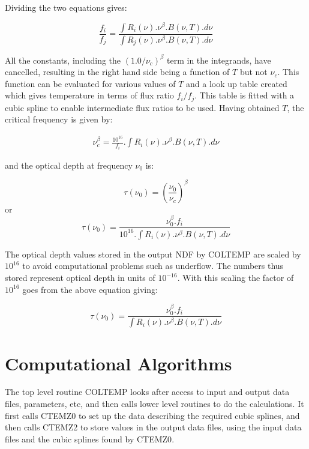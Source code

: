 Dividing the two equations gives:

\begin{equation}
\label{EQ:RAT}
\frac{f_{i}}{f_{j}} = \frac{ \int R_{i}(\nu).\nu^{\beta}.B( \nu, T ).d\nu}
{ \int R_{j}(\nu).\nu^{\beta}.B( \nu, T ).d\nu}
\end{equation}

All the constants, including the $(1.0/\nu_{c})^{\beta}$ term in the integrands,
have cancelled, resulting in the right hand side being a function of $T$ but not
$\nu_{c}$. This function can be evaluated for various values of $T$ and a look
up table created which gives temperature in terms of flux ratio $f_{i}/f_{j}$.
This table is fitted with a cubic spline to enable intermediate flux ratios to
be used. Having obtained $T$, the critical frequency is given by:

\begin{eqnarray*}
\nu_c^{\beta} = \frac{10^{16}}{f_{i}}.\int R_{i}(\nu).\nu^{\beta}.B( \nu, T ).d\nu
\end{eqnarray*}

and the optical depth at frequency $\nu_{0}$ is:

\begin{equation}
\label{EQ:TAUN}
\tau(\nu_{0}) = \left(\frac{\nu_{0}}{\nu_{c} }\right)^{\beta}
\end{equation}
or
\begin{equation}
\tau(\nu_{0}) = \frac{\nu_{0}^{\beta}.f_{i}}{10^{16}.\int R_{i}(\nu).\nu^{\beta}.B( \nu, T ).d\nu}
\end{equation}

The optical depth values stored in the output {\small NDF} by {\small COLTEMP}
are scaled by $10^{16}$ to avoid computational problems such as underflow. The
numbers thus stored represent optical depth in units of $10^{-16}$. With this
scaling the factor of $10^{16}$ goes from the above equation giving:

\begin{equation}
\label {EQ:TAU}
\tau(\nu_{0}) = \frac{\nu_{0}^{\beta}.f_{i}}{\int R_{i}(\nu).\nu^{\beta}.B( \nu, T ).d\nu}
\end{equation}

\section{Computational Algorithms}
The top level routine {\small COLTEMP} looks after access to input and output
data files, parameters, etc, and then calls lower level routines to do the
calculations. It first calls {\small CTEMZ0} to set up the data describing the
required cubic splines, and then calls {\small CTEMZ2} to store values in the
output data files, using the input data files and the cubic splines found by
{\small CTEMZ0}.

